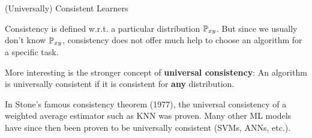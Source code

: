 \documentclass[11pt,compress,t,notes=noshow, xcolor=table]{beamer}
\begin{document}
\begin{frame}{(Universally) Consistent Learners }

Consistency is defined w.r.t. a particular distribution $\mathbb{P}_{xy}$.
But since we usually don't know $\mathbb{P}_{xy}$, consistency
does not offer much help to choose an algorithm for a specific task. 

\vfill 

More interesting is the stronger concept of \textbf{universal consistency}: An algorithm is universally consistent if it is consistent for \textbf{any} distribution. 

\vfill 

In Stone's famous consistency theorem (1977), the universal consistency of a weighted average estimator such as KNN was proven. Many other ML models have since then been proven to be universally consistent (SVMs, ANNs, etc.).



\end{frame}





\end{document}
